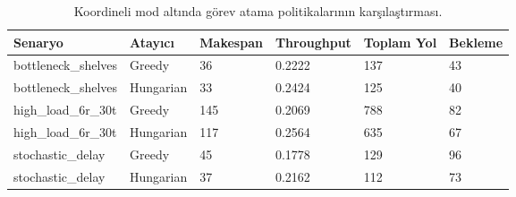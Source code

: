 \begin{table}[t]
\centering
\small
\begin{tabular}{llllll}
\hline
Senaryo & Atayıcı & Makespan & Throughput & Toplam Yol & Bekleme \\
\hline
bottleneck\_shelves & Greedy & 36 & 0.2222 & 137 & 43 \\
bottleneck\_shelves & Hungarian & 33 & 0.2424 & 125 & 40 \\
high\_load\_6r\_30t & Greedy & 145 & 0.2069 & 788 & 82 \\
high\_load\_6r\_30t & Hungarian & 117 & 0.2564 & 635 & 67 \\
stochastic\_delay & Greedy & 45 & 0.1778 & 129 & 96 \\
stochastic\_delay & Hungarian & 37 & 0.2162 & 112 & 73 \\
\hline
\end{tabular}
\caption{Koordineli mod altında görev atama politikalarının karşılaştırması.}
\label{tab:allocator_ablation}
\end{table}
